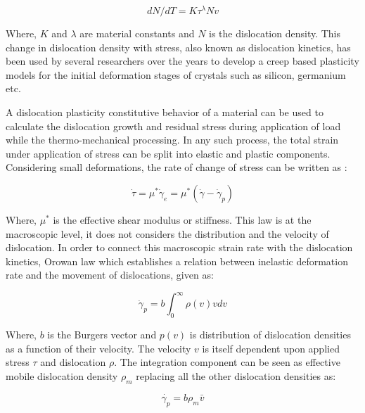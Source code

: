 \begin{equation}
   dN/dT = K \tau^{\lambda} N v\label{disl_change}
\end{equation}

Where, $K$ and $\lambda$ are material constants and $N$ is the dislocation density. This change in dislocation density with stress, also known as dislocation kinetics, has been used by several researchers over the years \cite{takahashi2010generation,nakano2011numerical,meese2006thermo,cochard2013novel} to develop a creep based plasticity models for the initial deformation stages of crystals such as silicon, germanium etc.

A dislocation plasticity constitutive behavior of a material can be used to calculate the dislocation growth and residual stress during application of load while the thermo-mechanical processing. In any such process, the total strain under application of stress can be split into elastic and plastic components. Considering small deformations, the rate of change of stress can be written as :

\begin{equation}
   \dot{\tau} = \mu^{*}\dot{\gamma}_{e} = \mu^{*}(\dot{\gamma}- \dot{\gamma}_{p})\label{rate_eqn}
\end{equation}

Where, $\mu^{*}$ is the effective shear modulus or stiffness. This law is at the macroscopic level, it does not considers the distribution and the velocity of dislocation. In order to connect this macroscopic strain rate with the dislocation kinetics, Orowan law which establishes a relation between inelastic deformation rate and the movement of dislocations, given as:

\begin{equation}
   \dot{\gamma}_{p} = b \int_{0}^{\infty} \rho(v)vdv \label{machine_eqn}
\end{equation}

Where, $b$ is the Burgers vector and $p(v)$ is distribution of dislocation densities as a function of their velocity.  The velocity $v$ is itself dependent upon applied stress $\tau$ and dislocation $\rho$. The integration component can be seen as effective mobile dislocation density $\rho_{m}$ replacing all the other dislocation densities as: 

\begin{equation}
   \dot{\gamma_{p}} = b \rho_{m} \bar{v} \label{orowan_law}
\end{equation}

